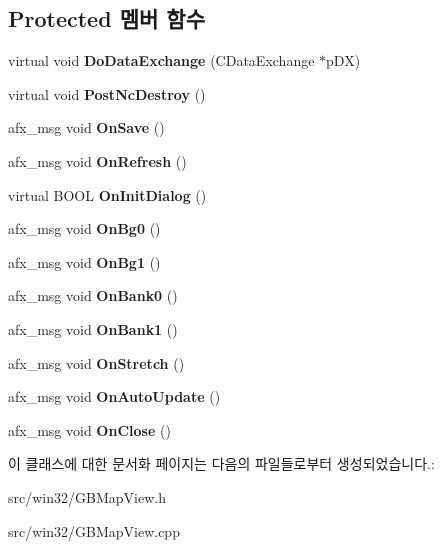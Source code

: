 \subsection*{Protected 멤버 함수}
\begin{DoxyCompactItemize}
\item 
\mbox{\label{class_g_b_map_view_a8d268ce36e59f20ebabe08aa9dbed9f0}} 
virtual void {\bfseries Do\+Data\+Exchange} (C\+Data\+Exchange $\ast$p\+DX)
\item 
\mbox{\label{class_g_b_map_view_ac613a0601eb7bea0ca757dda85011b73}} 
virtual void {\bfseries Post\+Nc\+Destroy} ()
\item 
\mbox{\label{class_g_b_map_view_a667f0f830b816e2ec34519d75a5ad488}} 
afx\+\_\+msg void {\bfseries On\+Save} ()
\item 
\mbox{\label{class_g_b_map_view_ac34b80cd3cb8b8b6d434e59dcfb3bed2}} 
afx\+\_\+msg void {\bfseries On\+Refresh} ()
\item 
\mbox{\label{class_g_b_map_view_a3bcd4b5e76fbe0ae04809770fce64765}} 
virtual B\+O\+OL {\bfseries On\+Init\+Dialog} ()
\item 
\mbox{\label{class_g_b_map_view_a7e9247c42189f718f173f765c4d5a5ba}} 
afx\+\_\+msg void {\bfseries On\+Bg0} ()
\item 
\mbox{\label{class_g_b_map_view_a8cbe9a5f305ebaff40a3a345f444ef98}} 
afx\+\_\+msg void {\bfseries On\+Bg1} ()
\item 
\mbox{\label{class_g_b_map_view_a157cce075c5c7ad137098c04201ce30d}} 
afx\+\_\+msg void {\bfseries On\+Bank0} ()
\item 
\mbox{\label{class_g_b_map_view_a7a1e36efab710bedd617b431486a42b3}} 
afx\+\_\+msg void {\bfseries On\+Bank1} ()
\item 
\mbox{\label{class_g_b_map_view_a9938d288e7e3c1b36757cbf49ff4bb97}} 
afx\+\_\+msg void {\bfseries On\+Stretch} ()
\item 
\mbox{\label{class_g_b_map_view_ad58a2f86c686e80be789229bdee2e64f}} 
afx\+\_\+msg void {\bfseries On\+Auto\+Update} ()
\item 
\mbox{\label{class_g_b_map_view_a71cb2125ab0c6216749d128c16d37bff}} 
afx\+\_\+msg void {\bfseries On\+Close} ()
\end{DoxyCompactItemize}


이 클래스에 대한 문서화 페이지는 다음의 파일들로부터 생성되었습니다.\+:\begin{DoxyCompactItemize}
\item 
src/win32/G\+B\+Map\+View.\+h\item 
src/win32/G\+B\+Map\+View.\+cpp\end{DoxyCompactItemize}
